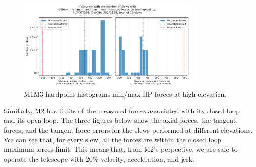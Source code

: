 \begin{figure}
    \centering
    \includegraphics[width=0.8\textwidth]{spa/20_vel_acc_jerk/BLOCK-T293_m1m3_hp_histograms.png}
    \caption{M1M3 hardpoint histograms min/max HP forces at high elevation.}
    \label{fig:block293_m1m3_hp_histograms}
    \end{figure}

Similarly, M2 has limits of the measured forces associated with its closed loop and its
open loop. The three figures below show the axial forces, the tangent forces, and the tangent
force errors for the slews performed at different elevations. We can see that, for every slew,
all the forces are within the closed loop maximum forces limit. This means that, from M2's
perpective, we are safe to operate the telescope with 20\% velocity, acceleration, and jerk.

